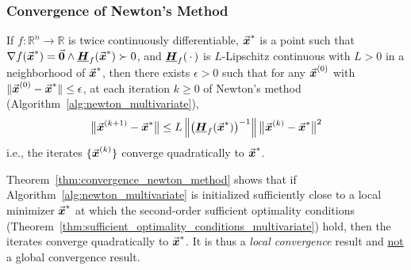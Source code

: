 \subsubsection{Convergence of Newton's Method}
\label{subsubsec:newton_convergence}

\begin{theorem}\label{thm:convergence_newton_method}
If \(f:\mathbb{R}^{n}\to\mathbb{R}\) is twice continuously differentiable, 
\(\vec{\boldsymbol{x}}^{*}\) is a point such that \(\nabla f(\vec{\boldsymbol{x}}^{*}) = \vec{\boldsymbol{0}} \wedge \underline{\boldsymbol{H}}_{f}(\vec{\boldsymbol{x}}^{*}) \succ 0\),
and \(\underline{\boldsymbol{H}}_{f}(\,\cdot \,)\) is \(L\)-Lipschitz continuous with \(L>0\) in a neighborhood of \(\vec{\boldsymbol{x}}^{*}\),
then there exists \(\epsilon>0\) such that for any \(\vec{\boldsymbol{x}}^{(0)}\) with \(\|\vec{\boldsymbol{x}}^{(0)}-\vec{\boldsymbol{x}}^{*}\| \leq \epsilon\), 
at each iteration \(k \geq 0\) of Newton's method (Algorithm~\ref{alg:newton_multivariate}), 
\begin{equation}
\label{eq:convergence_newton_method}
\big\|\vect{x}^{(k+1)}-\vect{x}^{*}\big\| \leq L\left\|\big(\matr{H}_{f}(\vect{x}^{*})\big)^{-1}\right\| \big\|\vect{x}^{(k)}-\vect{x}^{*}\big\|^{2} %
\end{equation}
i.e., the iterates \(\{\vec{\boldsymbol{x}}^{(k)}\}\) converge quadratically to \(\vec{\boldsymbol{x}}^{*}\).
\end{theorem}

\begin{remark}
Theorem~\ref{thm:convergence_newton_method} shows that if Algorithm~\ref{alg:newton_multivariate} is initialized sufficiently close to a local minimizer \(\vec{\boldsymbol{x}}^{*}\) at which the second-order sufficient optimality conditions (Theorem~\ref{thm:sufficient_optimality_conditions_multivariate}) hold, then the iterates converge quadratically to \(\vec{\boldsymbol{x}}^{*}\).
It is thus a \emph{local convergence} result and \underline{not} a global convergence result.
\end{remark}

